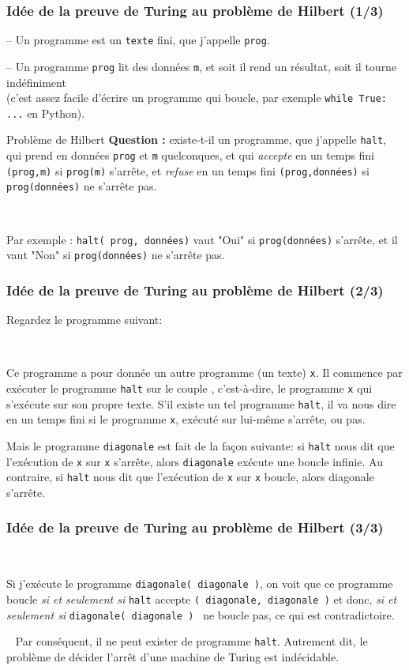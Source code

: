 \documentclass{beamer}
\newcommand{\mypause}{~}
\newcommand{\prog}[1]{\alert{\texttt{#1}}}
\begin{document}
\frame
{
\frametitle{Idée de la preuve de Turing au problème de Hilbert (1/3)}

-- Un programme est un \prog{texte} fini, que j'appelle \prog{prog}.

-- Un programme \prog{prog} lit des données \prog{m}, et soit il rend un résultat, soit il tourne indéfiniment\\
(c'est assez facile d'écrire un programme qui boucle, par exemple \prog{while True: ...} en Python).
\mypause{}
\vspace*{10pt}

\begin{block}{Problème de Hilbert}
\textbf{Question :} existe-t-il un programme, que j'appelle \prog{halt}, qui prend en données \prog{prog} et \prog{m} quelconques,
et qui {\em accepte} en un temps fini \prog{(prog,m)} si \prog{prog(m)} s'arrête,
et {\em refuse} en un temps fini \prog{(prog,données)} si \prog{prog(données)} ne s'arrête pas.
\end{block}

\mypause{}
\vspace*{10pt}

Par exemple : \prog{halt( prog, données)} vaut "Oui" si \prog{prog(données)} s'arrête, et il vaut "Non" si
\prog{prog(données)} ne s'arrête pas.

}

\frame
{
\frametitle{Idée de la preuve de Turing au problème de Hilbert (2/3)}
{\footnotesize
Regardez le programme suivant:

\mypause{}

Ce programme a pour donnée un autre programme (un texte) \prog{x}. Il commence
par exécuter le programme \prog{halt} sur le couple , c'est-à-dire,
le programme \prog{x} qui s'exécute sur son propre texte. S'il existe
un tel programme \prog{halt}, il va nous dire en un temps fini si le programme
\prog{x}, exécuté sur lui-même s'arrête, ou pas.
\mypause{}
\vspace*{10pt}

Mais le programme \prog{diagonale} est fait de la façon suivante: si
\prog{halt} nous dit que l'exécution de \prog{x} sur \prog{x} s'arrête, alors
\prog{diagonale} exécute une boucle infinie. Au contraire, si \prog{halt}
nous dit que l'exécution de \prog{x} sur \prog{x} boucle, alors diagonale s'arrête.

}
}

\frame
{
\frametitle{Idée de la preuve de Turing au problème de Hilbert (3/3)}

\mypause{}

Si j'exécute le programme \prog{diagonale( diagonale )}, on voit que ce programme boucle
\emph{si et seulement si} \prog{halt} accepte \prog{( diagonale, diagonale )}
et donc, \emph{si et seulement si} \prog{diagonale( diagonale ) } ne boucle pas, ce qui est \alert{contradictoire}.

\mypause{}
\vspace*{0.5cm}
Par conséquent, il ne peut exister de programme \prog{halt}.
Autrement dit, le problème de décider l'arrêt d'une machine de Turing est \alert{indécidable}.

}
\end{document}
